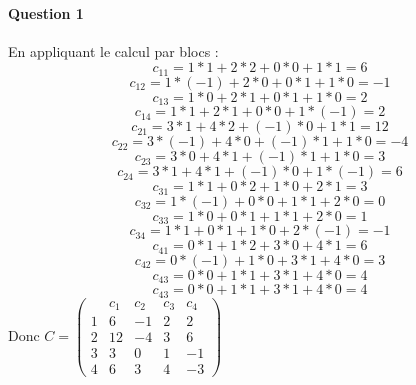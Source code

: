 \documentclass[a4paper,10pt]{report}
\begin{document}
\paragraph{Question 1}
En appliquant le calcul par blocs :
\begin{equation}
 c_{11} = 1 * 1 + 2 * 2 + 0 * 0 + 1 * 1 = 6
\end{equation}
\begin{equation}
 c_{12} = 1 * (-1) + 2 * 0 + 0 * 1 + 1 * 0 = -1
\end{equation}
\begin{equation}
c_{13} = 1 * 0 + 2 * 1 + 0 * 1 + 1 * 0 = 2
\end{equation}
\begin{equation}
c_{14} = 1 * 1 + 2 * 1 + 0 * 0 + 1 * (-1) = 2
\end{equation}
\begin{equation}
 c_{21} = 3 * 1 + 4 * 2 + (-1) * 0 + 1 * 1 = 12
\end{equation}
\begin{equation}
c_{22} = 3 * (-1) + 4 * 0 + (-1) * 1 + 1 * 0 = -4
\end{equation}
\begin{equation}
c_{23} = 3 * 0 + 4 * 1 + (-1) * 1 + 1 * 0 = 3
\end{equation}
\begin{equation}
c_{24} = 3 * 1 + 4 * 1 + (-1) * 0 + 1 * (-1) = 6
\end{equation}
\begin{equation}
c_{31} = 1 * 1 + 0 * 2 + 1 * 0 + 2 * 1 = 3
\end{equation}
\begin{equation}
c_{32} = 1 * (-1) + 0 * 0 + 1 * 1 + 2 * 0 = 0
\end{equation}
\begin{equation}
c_{33} = 1 * 0 + 0 * 1 + 1 * 1 + 2 * 0 = 1
\end{equation}
\begin{equation}
c_{34} = 1 * 1 + 0 * 1 + 1 * 0 + 2 * (-1) = -1
\end{equation}
\begin{equation}
c_{41} = 0 * 1 + 1 * 2 + 3 * 0 + 4 * 1 = 6
\end{equation}
\begin{equation}
c_{42} = 0 * (-1) + 1 * 0 + 3 * 1 + 4 * 0 = 3
\end{equation}
\begin{equation}
c_{43} = 0 * 0 + 1 * 1 + 3 * 1 + 4 * 0 = 4
\end{equation}
\begin{equation}
c_{43} = 0 * 0 + 1 * 1 + 3 * 1 + 4 * 0 = 4
\end{equation}
Donc 
\begin{math}
C = \begin{pmatrix}
  & c_1 & c_2 & c_3 & c_4 \\
1 & 6 & -1 & 2 & 2 \\
2 & 12 & -4 & 3 & 6 \\
3 & 3 & 0 & 1 & -1 \\
4 & 6 & 3 & 4 & -3
\end{pmatrix}
\end{math}
\end{document}
